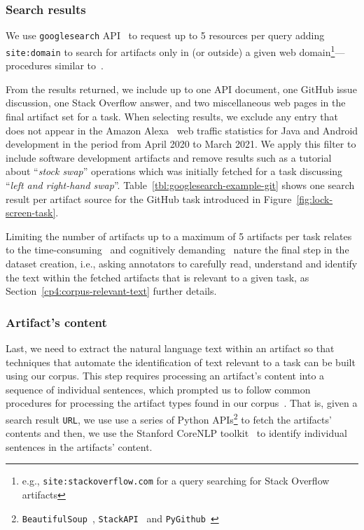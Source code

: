 \subsubsection{Search results}


We use \texttt{googlesearch} API~\cite{googlesearch} to 
request up to 5 resources per query
adding \texttt{site:domain} to search for artifacts 
only in (or outside) a given web domain\footnote{e.g., \texttt{site:stackoverflow.com} for a query searching for Stack Overflow artifacts}---procedures similar to~\cite{Xu2017}.



From the results returned, we include up to
one API document, one GitHub issue discussion, one Stack Overflow answer, and two miscellaneous web pages
in the final artifact set for a task. 
When selecting results, we exclude any entry that does not appear in the Amazon Alexa~\cite{alexa} web traffic statistics for Java and Android development in the period from April 2020 to March 2021. 
We apply this filter to include software development artifacts and remove results 
such as a tutorial about  ``\textit{stock swap}'' operations which was initially fetched 
for a task discussing ``\textit{left and right-hand swap}''.
Table~\ref{tbl:googlesearch-example-git} shows one search result per artifact source for the GitHub task introduced in Figure~\ref{fig:lock-screen-task}.


Limiting the number of artifacts up to a maximum of 5 artifacts per task relates to the
time-consuming~\cite{al2017} and cognitively demanding~\cite{Piorkowski2016} 
nature the final step in the dataset creation, i.e.,  
asking annotators to carefully read, understand and identify the text
within the fetched artifacts that is relevant to a given task,
as Section~\ref{cp4:corpus-relevant-text} further details.







\subsubsection{Artifact's content}

Last, we need to extract the natural language text within an artifact so that 
techniques that automate the identification of text relevant to a task can be built 
using our corpus.  This step requires processing an artifact's content 
into a sequence of individual sentences,
which prompted us to follow common procedures for processing the artifact types found in our corpus~\cite{Arya2019, nadi2020}.
That is, given a search result \texttt{URL}, we use use a series of Python 
APIs\footnote{\texttt{BeautifulSoup}~\cite{beautifulsoup4},
\texttt{StackAPI}~\cite{StackAPI} and \texttt{PyGithub}~\cite{PyGithub}}
to fetch the artifacts' contents
and then, we use the Stanford CoreNLP toolkit~\cite{CoreNLP} to identify 
individual sentences in the artifacts' content.







